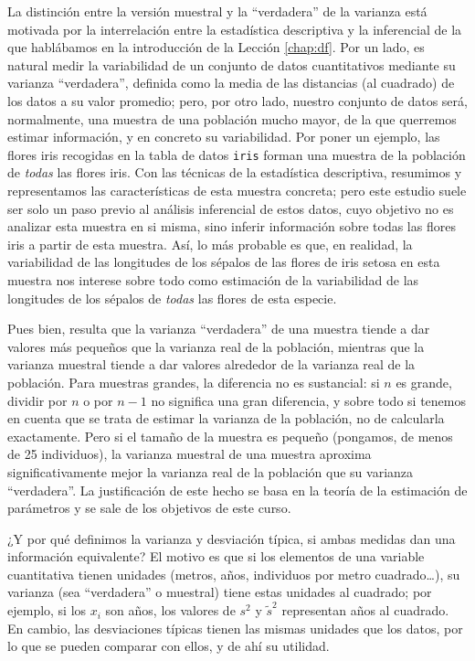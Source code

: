 \documentclass[
]{book}
\theoremstyle{definition}
\theoremstyle{definition}
\theoremstyle{definition}
\theoremstyle{remark}
\begin{document}
La distinción entre la versión muestral y la ``verdadera'' de la varianza está motivada por la interrelación entre la estadística descriptiva y la inferencial de la que hablábamos en la introducción de la Lección \ref{chap:df}. Por un lado, es natural medir la variabilidad de un conjunto de datos cuantitativos mediante su varianza ``verdadera'', definida como la media de las distancias (al cuadrado) de los datos a su valor promedio; pero, por otro lado, nuestro conjunto de datos será, normalmente, una muestra de una población mucho mayor, de la que querremos estimar información, y en concreto su variabilidad. Por poner un ejemplo, las flores iris recogidas en la tabla de datos \texttt{iris} forman una muestra de la población de \emph{todas} las flores iris. Con las técnicas de la estadística descriptiva, resumimos y representamos las características de esta muestra concreta; pero este estudio suele ser solo un paso previo al análisis inferencial de estos datos, cuyo objetivo no es analizar esta muestra en si misma, sino inferir información sobre todas las flores iris a partir de esta muestra. Así, lo más probable es que, en realidad, la variabilidad de las longitudes de los sépalos de las flores de iris setosa en esta muestra nos interese sobre todo como estimación de la variabilidad de las longitudes de los sépalos de \emph{todas} las flores de esta especie.

Pues bien, resulta que la varianza ``verdadera'' de una muestra tiende a dar valores más pequeños que la varianza real de la población, mientras que la varianza muestral tiende a dar valores alrededor de la varianza real de la población. Para muestras grandes, la diferencia no es sustancial: si \(n\) es grande, dividir por \(n\) o por \(n-1\) no significa una gran diferencia, y sobre todo si tenemos en cuenta que se trata de estimar la varianza de la población, no de calcularla exactamente. Pero si el tamaño de la muestra es pequeño (pongamos, de menos de 25 individuos), la varianza muestral de una muestra aproxima significativamente mejor la varianza real de la población que su varianza ``verdadera''. La justificación de este hecho se basa en la teoría de la estimación de parámetros y se sale de los objetivos de este curso.

¿Y por qué definimos la varianza y desviación típica, si ambas medidas dan una información equivalente? El motivo es que si los elementos de una variable cuantitativa tienen unidades (metros, años, individuos por metro cuadrado\ldots), su varianza (sea ``verdadera'' o muestral) tiene estas unidades al cuadrado; por ejemplo, si los \(x_i\) son años, los valores de \(s^2\) y \(\tilde{s}^2\) representan años al cuadrado. En cambio, las desviaciones típicas tienen las mismas unidades que los datos, por lo que se pueden comparar con ellos, y de ahí su utilidad.
\end{document}
